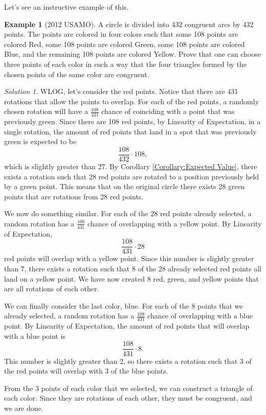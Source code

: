 \documentclass[l1pt]{article}
\theoremstyle{plain}
\theoremstyle{definition}
\newtheorem{example}[thm]{Example}
\theoremstyle{remark}
\newtheorem*{solution}{Solution}
\begin{document}
Let's see an instructive example of this.

\begin{example}[2012 USAMO]
A circle is divided into 432 congruent arcs by 432 points. The points are colored in four colors such that some 108 points are colored Red, some 108 points are colored Green, some 108 points are colored Blue, and the remaining 108 points are colored Yellow. Prove that one can choose three points of each color in such a way that the four triangles formed by the chosen points of the same color are congruent.
\end{example} 

\begin{solution}
WLOG, let's consider the red points. Notice that there are 431 rotations that allow the points to overlap. For each of the red points, a randomly chosen rotation will have a $\frac{108}{431}$ chance of coinciding with a point that was previously green. Since there are 108 red points, by Linearity of Expectation, in a single rotation, the amount of red points that land in a spot that was previously green is expected to be \[\frac{108}{432}\cdot 108, \] which is slightly greater than 27. By Corollary \ref{Corollary:Expected Value}, there exists a rotation such that 28 red points are rotated to a position previously held by a green point. This means that on the original circle there exists 28 green points that are rotations from 28 red points.

We now do something similar. For each of the 28 red points already selected, a random rotation has a $\frac{108}{431}$ chance of overlapping with a yellow point. By Linearity of Expectation, \[\frac{108}{431}\cdot 28\] red points will overlap with a yellow point. Since this number is slightly greater than 7, there exists a rotation such that 8 of the 28 already selected red points all land on a yellow point. We have now created 8 red, green, and yellow points that are all rotations of each other.

We can finally consider the last color, blue. For each of the 8 points that we already selected, a random rotation has a $\frac{108}{431}$ chance of overlapping with a blue point. By Linearity of Expectation, the amount of red points that will overlap with a blue point is \[\frac{108}{431}\cdot 8.\] This number is slightly greater than 2, so there exists a rotation such that 3 of the red points will overlap with 3 of the blue points. 

From the 3 points of each color that we selected, we can construct a triangle of each color. Since they are rotations of each other, they must be congruent, and we are done.
\end{solution}
\end{document}
